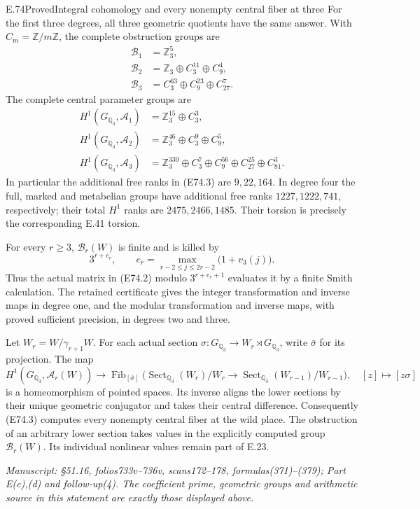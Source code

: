 \begin{statement}{E.74}{Proved}{Integral cohomology and every nonempty central fiber at three}
For the first three degrees, all three geometric quotients
have the same answer. With $C_m=\mathbb Z/m\mathbb Z$,
the complete obstruction groups are
\[
 \begin{split}
 \mathcal B_1&=\mathbb Z_3^5,\\
 \mathcal B_2&=\mathbb Z_3\oplus C_3^{11}\oplus C_9^4,\\
 \mathcal B_3&=C_3^{63}\oplus C_9^{23}\oplus C_{27}^7.
 \end{split}
 \tag{E74.5}
\]
The complete central parameter groups are
\[
 \begin{split}
 H^1(G_{\mathbb Q_3},\mathcal A_1)
   &=\mathbb Z_3^{15}\oplus C_3^3,\\
 H^1(G_{\mathbb Q_3},\mathcal A_2)
   &=\mathbb Z_3^{46}\oplus C_3^9\oplus C_9^5,\\
 H^1(G_{\mathbb Q_3},\mathcal A_3)
   &=\mathbb Z_3^{330}\oplus C_3^7\oplus C_9^{56}
                         \oplus C_{27}^{25}\oplus C_{81}^3.
 \end{split}
 \tag{E74.6}
\]
In particular the additional free ranks in (E74.3) are
$9,22,164$. In degree four the full, marked and metabelian
groups have additional free ranks $1227,1222,741$,
respectively; their total $H^1$ ranks are $2475,2466,1485$.
Their torsion is precisely the corresponding E.41 torsion.

For every $r\ge3$, $\mathcal B_r(W)$ is finite and is killed by
\[
 3^{r+e_r},\qquad
 e_r=\max_{r-2\le j\le2r-2}\bigl(1+v_3(j)\bigr).
 \tag{E74.7}
\]
Thus the actual matrix in (E74.2) modulo
$3^{r+e_r+1}$ evaluates it by a finite Smith calculation.
The retained certificate gives the integer transformation
and inverse maps in degree one, and the modular transformation
and inverse maps, with proved sufficient precision, in
degrees two and three.

Let $W_r=W/\gamma_{r+1}W$. For each actual section
$\sigma:G_{\mathbb Q_3}\to W_r\rtimes G_{\mathbb Q_3}$,
write $\bar\sigma$ for its projection. The map
\[
 H^1(G_{\mathbb Q_3},\mathcal A_r(W))
   \longrightarrow
   \operatorname{Fib}_{[\bar\sigma]}
      \bigl(\operatorname{Sect}_{\mathbb Q_3}(W_r)/W_r
         \longrightarrow
         \operatorname{Sect}_{\mathbb Q_3}(W_{r-1})/W_{r-1}\bigr),
 \quad [z]\longmapsto[z\sigma]
 \tag{E74.8}
\]
is a homeomorphism of pointed spaces. Its inverse aligns
the lower sections by their unique geometric conjugator
and takes their central difference. Consequently (E74.3)
computes every nonempty central fiber at the wild place.
The obstruction of an arbitrary lower section takes values
in the explicitly computed group $\mathcal B_r(W)$.
Its individual nonlinear values remain part of E.23.

\emph{Manuscript: \S51.16, folios733v--736v, scans172--178,
formulas(371)--(379); Part E(c),(d) and follow-up(4).
The coefficient prime, geometric groups and arithmetic
source in this statement are exactly those displayed above.}
\end{statement}

